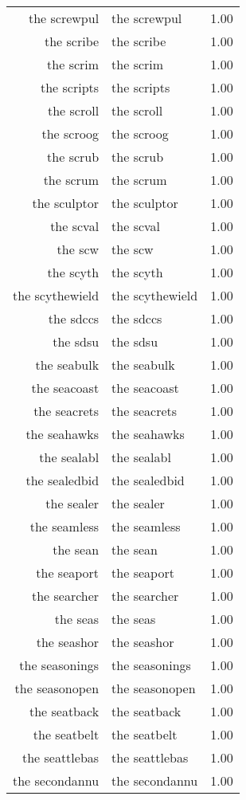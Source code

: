 \begin{table}[ht]
\begin{tabular}{rlr}
  the screwpul & the screwpul & 1.00 \\ 
  the scribe & the scribe & 1.00 \\ 
  the scrim & the scrim & 1.00 \\ 
  the scripts & the scripts & 1.00 \\ 
  the scroll & the scroll & 1.00 \\ 
  the scroog & the scroog & 1.00 \\ 
  the scrub & the scrub & 1.00 \\ 
  the scrum & the scrum & 1.00 \\ 
  the sculptor & the sculptor & 1.00 \\ 
  the scval & the scval & 1.00 \\ 
  the scw & the scw & 1.00 \\ 
  the scyth & the scyth & 1.00 \\ 
  the scythewield & the scythewield & 1.00 \\ 
  the sdccs & the sdccs & 1.00 \\ 
  the sdsu & the sdsu & 1.00 \\ 
  the seabulk & the seabulk & 1.00 \\ 
  the seacoast & the seacoast & 1.00 \\ 
  the seacrets & the seacrets & 1.00 \\ 
  the seahawks & the seahawks & 1.00 \\ 
  the sealabl & the sealabl & 1.00 \\ 
  the sealedbid & the sealedbid & 1.00 \\ 
  the sealer & the sealer & 1.00 \\ 
  the seamless & the seamless & 1.00 \\ 
  the sean & the sean & 1.00 \\ 
  the seaport & the seaport & 1.00 \\ 
  the searcher & the searcher & 1.00 \\ 
  the seas & the seas & 1.00 \\ 
  the seashor & the seashor & 1.00 \\ 
  the seasonings & the seasonings & 1.00 \\ 
  the seasonopen & the seasonopen & 1.00 \\ 
  the seatback & the seatback & 1.00 \\ 
  the seatbelt & the seatbelt & 1.00 \\ 
  the seattlebas & the seattlebas & 1.00 \\ 
  the secondannu & the secondannu & 1.00 \\ 

\end{tabular}
\end{table}
